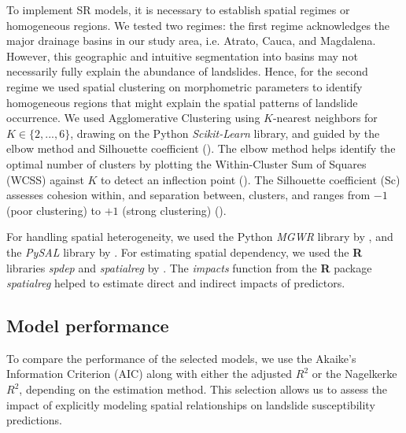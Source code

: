 \documentclass[lineno,pdflatex,sn-basic]{sn-jnl}%
\theoremstyle{thmstyleone}%
\theoremstyle{thmstyletwo}%
\theoremstyle{thmstylethree}%
\begin{document}
To implement SR models, it is necessary to establish spatial regimes or homogeneous regions. 
We tested two regimes:
the first regime acknowledges the major drainage basins in our study area, i.e. Atrato, Cauca, and Magdalena. 
However, this geographic and intuitive segmentation into basins may not necessarily fully explain the abundance of landslides. 
Hence, for the second regime we used spatial clustering on morphometric parameters to identify homogeneous regions that might explain the spatial patterns of landslide occurrence. 
We used Agglomerative Clustering using $K$-nearest neighbors for $K \in \{2, ..., 6\}$, drawing on the Python \textit{Scikit-Learn} library, and guided by the elbow method and Silhouette coefficient (\cite{scikit-learn2011}). 
The elbow method helps identify the optimal number of clusters by plotting the Within-Cluster Sum of Squares (WCSS) against $K$ to detect an inflection point (\cite{thorndike1953}). 
The Silhouette coefficient (Sc) assesses cohesion within, and separation between, clusters, and ranges from $-1$ (poor clustering) to $+1$ (strong clustering) (\cite{rousseeuw1987}).

For handling spatial heterogeneity, we used the Python \textit{MGWR} library by \cite{mgwr2019, oshan2019mgwr}, and the \textit{PySAL} library by \cite{pysal2007}. 
For estimating spatial dependency, we used the \textbf{R} libraries \textit{spdep} and \textit{spatialreg} by \cite{bivand2022}. 
The \textit{impacts} function from the  \textbf{R} package \textit{spatialreg} helped to estimate direct and indirect impacts of predictors. 

\subsection{Model performance}\label{modelPerformance}

To compare the performance of the selected models, we use the Akaike’s Information Criterion (AIC) along with either the adjusted $R^2$ or the Nagelkerke $R^2$, depending on the estimation method. 
This selection allows us to assess the impact of explicitly modeling spatial relationships on landslide susceptibility predictions.
\end{document}
